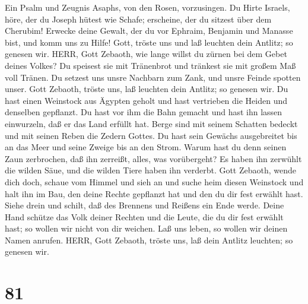 Ein Psalm und Zeugnis Asaphs, von den Rosen, vorzusingen.
Du Hirte Israels, höre, der du Joseph hütest wie Schafe; erscheine, der
du sitzest über dem Cherubim!  Erwecke deine Gewalt, der du
vor Ephraim, Benjamin und Manasse bist, und komm uns zu Hilfe!
 Gott, tröste uns und laß leuchten dein Antlitz; so genesen
wir.  HERR, Gott Zebaoth, wie lange willst du zürnen bei dem
Gebet deines Volkes?  Du speisest sie mit Tränenbrot und
tränkest sie mit großem Maß voll Tränen.  Du setzest uns
unsre Nachbarn zum Zank, und unsre Feinde spotten unser. 
Gott Zebaoth, tröste uns, laß leuchten dein Antlitz; so genesen wir.
 Du hast einen Weinstock aus Ägypten geholt und hast
vertrieben die Heiden und denselben gepflanzt.  Du hast vor
ihm die Bahn gemacht und hast ihn lassen einwurzeln, daß er das Land
erfüllt hat.  Berge sind mit seinem Schatten bedeckt und
mit seinen Reben die Zedern Gottes.  Du hast sein Gewächs
ausgebreitet bis an das Meer und seine Zweige bis an den Strom.
 Warum hast du denn seinen Zaun zerbrochen, daß ihn
zerreißt, alles, was vorübergeht?  Es haben ihn zerwühlt
die wilden Säue, und die wilden Tiere haben ihn verderbt. 
Gott Zebaoth, wende dich doch, schaue vom Himmel und sieh an und suche
heim diesen Weinstock  und halt ihn im Bau, den deine
Rechte gepflanzt hat und den du dir fest erwählt hast. 
Siehe drein und schilt, daß des Brennens und Reißens ein Ende werde.
 Deine Hand schütze das Volk deiner Rechten und die Leute,
die du dir fest erwählt hast;  so wollen wir nicht von dir
weichen. Laß uns leben, so wollen wir deinen Namen anrufen.
 HERR, Gott Zebaoth, tröste uns, laß dein Antlitz leuchten;
so genesen wir.

\hypertarget{section-80}{%
\section{81}\label{section-80}}

